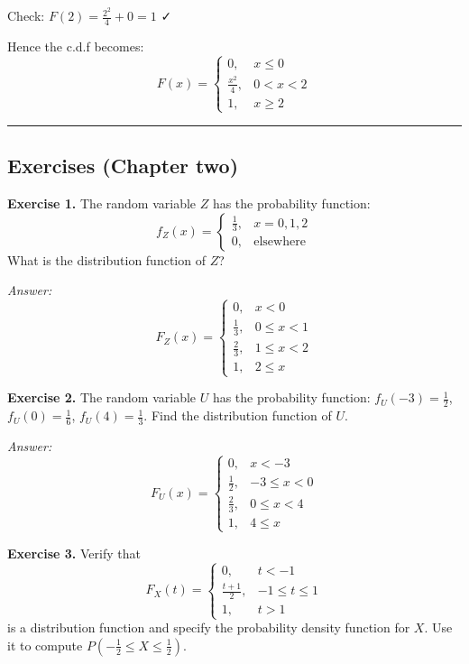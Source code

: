 \documentclass[
]{article}
\begin{document}
Check: \(F(2) = \frac{2^2}{4} + 0 = 1\) ✓

Hence the c.d.f becomes:
\[F(x) = \begin{cases} 0, & x \leq 0 \\ \frac{x^2}{4}, & 0 < x < 2 \\ 1, & x \geq 2 \end{cases}\]

\begin{center}\rule{0.5\linewidth}{0.5pt}\end{center}

\subsection{Exercises (Chapter two)}\label{exercises-chapter-two}

\textbf{Exercise 1.} The random variable \(Z\) has the probability
function:
\[f_Z(x) = \begin{cases} \frac{1}{3}, & x = 0, 1, 2 \\ 0, & \text{elsewhere} \end{cases}\]
What is the distribution function of \(Z\)?

\emph{Answer:}
\[F_Z(x) = \begin{cases} 0, & x < 0 \\ \frac{1}{3}, & 0 \leq x < 1 \\ \frac{2}{3}, & 1 \leq x < 2 \\ 1, & 2 \leq x \end{cases}\]

\textbf{Exercise 2.} The random variable \(U\) has the probability
function: \(f_U(-3) = \frac{1}{2}\), \(f_U(0) = \frac{1}{6}\),
\(f_U(4) = \frac{1}{3}\). Find the distribution function of \(U\).

\emph{Answer:}
\[F_U(x) = \begin{cases} 0, & x < -3 \\ \frac{1}{2}, & -3 \leq x < 0 \\ \frac{2}{3}, & 0 \leq x < 4 \\ 1, & 4 \leq x \end{cases}\]

\textbf{Exercise 3.} Verify that
\[F_X(t) = \begin{cases} 0, & t < -1 \\ \frac{t+1}{2}, & -1 \leq t \leq 1 \\ 1, & t > 1 \end{cases}\]
is a distribution function and specify the probability density function
for \(X\). Use it to compute
\(P\!\left(-\frac{1}{2} \leq X \leq \frac{1}{2}\right)\).
\end{document}
